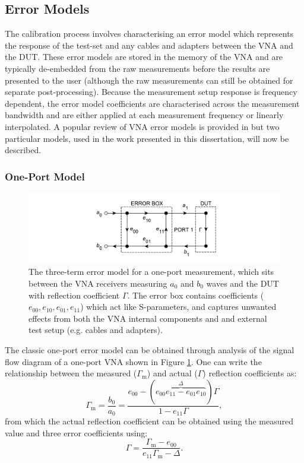 \documentclass[../thesis/thesis.tex]{subfiles}
\begin{document}
\subsection{Error Models}

The calibration process involves characterising an error model which represents the response of the test-set and any cables and adapters between the VNA and the DUT. These error models are stored in the memory of the VNA and are typically de-embedded from the raw measurements before the results are presented to the user (although the raw measurements can still be obtained for separate post-processing). Because the measurement setup response is frequency dependent, the error model coefficients are characterised across the measurement bandwidth and are either applied at each measurement frequency or linearly interpolated. A popular review of VNA error models is provided in \cite{Rytting_2000} but two particular models, used in the work presented in this dissertation, will now be described.

\subsubsection{One-Port Model}

\begin{figure}
	\centering
	\includegraphics[width=\textwidth]{ch2_oneport}
	\caption[The three-term VNA error model.]{The three-term error model for a one-port measurement, which sits between the VNA receivers measuring $a_0$ and $b_0$ waves and the DUT with reflection coefficient $\Gamma$. The error box contains coefficients ($e_{00}, e_{10}, e_{01}, e_{11}$) which act like S-parameters, and captures unwanted effects from both the VNA internal components and and external test setup (e.g. cables and adapters).}
	\label{ch2_fig_oneport}
\end{figure}

The classic one-port error model can be obtained through analysis of the signal flow diagram of a one-port VNA shown in Figure \ref{ch2_fig_oneport}. One can write the relationship between the measured ($\Gamma_\textrm{m}$) and actual ($\Gamma$) reflection coefficients as:
\begin{equation}
\Gamma_\textrm{m}=\frac{b_0}{a_0}=\frac{e_{00}-(\overbrace{e_{00}e_{11}-e_{01}e_{10}}^\Delta)\Gamma}{1-e_{11}\Gamma},
\end{equation}
from which the actual reflection coefficient can be obtained using the measured value and three error coefficients using:
\begin{equation}
\Gamma=\frac{\Gamma_\textrm{m}-e_{00}}{e_{11}\Gamma_\textrm{m}-\Delta}.
\label{ch2_eqn_oneport1}
\end{equation}
\end{document}
